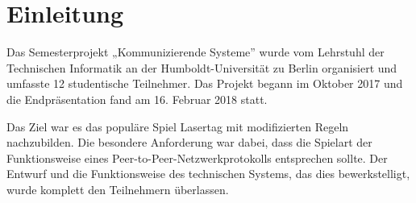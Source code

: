 \section{Einleitung}

Das Semesterprojekt „Kommunizierende Systeme” wurde vom Lehrstuhl der Technischen Informatik an der
Humboldt-Universität zu Berlin organisiert und umfasste 12 studentische Teilnehmer.
Das Projekt begann im Oktober 2017 und die Endpräsentation fand am 16. Februar 2018 statt.

Das Ziel war es das populäre Spiel Lasertag mit modifizierten Regeln nachzubilden.
Die besondere Anforderung war dabei, dass die Spielart der Funktionsweise eines
Peer-to-Peer-Netzwerkprotokolls entsprechen sollte.
Der Entwurf und die Funktionsweise des technischen Systems, das dies bewerkstelligt, wurde komplett
den Teilnehmern überlassen.
